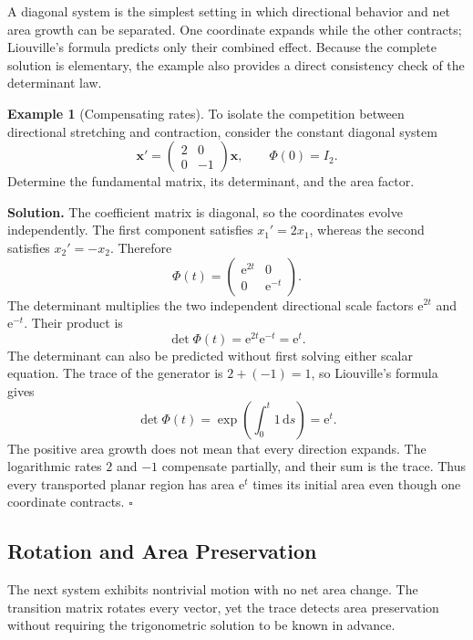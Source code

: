 \documentclass[11pt,a4paper]{article}
\newcommand{\be}{\begin{equation}}
\newcommand{\ee}{\end{equation}}
\newcommand{\lb}[1]{\label{#1}}
\newcommand{\e}{\mathrm{e}}
\newcommand{\dd}{\mathrm{d}}
\theoremstyle{definition}
\newtheorem{example}{Example}[section]
\newenvironment{solution}
{\par\noindent\textbf{Solution.}}
{\hfill$\square$\par}
\numberwithin{equation}{section}
\begin{document}
A diagonal system is the simplest setting in which directional behavior and net area growth can be separated. One coordinate expands while the other contracts; Liouville's formula predicts only their combined effect. Because the complete solution is elementary, the example also provides a direct consistency check of the determinant law.

\begin{example}[Compensating rates]
To isolate the competition between directional stretching and contraction, consider the constant diagonal system
\be
\mathbf{x}'
=
\begin{pmatrix}
2 & 0\\
0 & -1
\end{pmatrix}
\mathbf{x},
\qquad
\Phi(0)=I_2.
\lb{eq:example-diagonal}
\ee
Determine the fundamental matrix, its determinant, and the area factor.
\end{example}

\begin{solution}
The coefficient matrix is diagonal, so the coordinates evolve independently. The first component satisfies $x_1'=2x_1$, whereas the second satisfies $x_2'=-x_2$. Therefore
\be
\Phi(t)=
\begin{pmatrix}
\e^{2t} & 0\\
0 & \e^{-t}
\end{pmatrix}.
\lb{eq:example-diagonal-phi}
\ee
The determinant multiplies the two independent directional scale factors $\e^{2t}$ and $\e^{-t}$. Their product is
\be
\det\Phi(t)=\e^{2t}\e^{-t}=\e^t.
\lb{eq:example-diagonal-det}
\ee
The determinant can also be predicted without first solving either scalar equation. The trace of the generator is $2+(-1)=1$, so Liouville's formula gives
\be
\det\Phi(t)
=
\exp\left(\int_0^t1\,\dd s\right)
=\e^t.
\lb{eq:example-diagonal-liouville}
\ee
The positive area growth does not mean that every direction expands. The logarithmic rates $2$ and $-1$ compensate partially, and their sum is the trace. Thus every transported planar region has area $\e^t$ times its initial area even though one coordinate contracts.
\end{solution}


\subsection{Rotation and Area Preservation}

The next system exhibits nontrivial motion with no net area change. The transition matrix rotates every vector, yet the trace detects area preservation without requiring the trigonometric solution to be known in advance.
\end{document}
